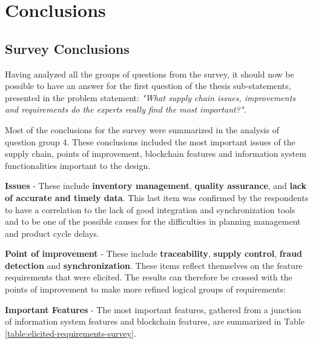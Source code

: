 
\section{Conclusions}

\subsection{Survey Conclusions}

Having analyzed all the groups of questions from the survey, it should now be possible to have an answer for the first question of the thesis sub-statements, presented in the problem statement: \textit{"What supply chain issues, improvements and requirements do the experts really find the most important?"}.

Most of the conclusions for the survey were summarized in the analysis of question group 4. These conclusions included the most important issues of the supply chain, points of improvement, blockchain features and information system functionalities important to the design.


\par \textbf{Issues} - These include \textbf{inventory management}, \textbf{quality assurance}, \textbf{} and \textbf{lack of accurate and timely data}. This last item was confirmed by the respondents to have a correlation to the lack of good integration and synchronization tools and to be one of the possible causes for the difficulties in planning management and product cycle delays.

\par \textbf{Point of improvement} - These include \textbf{traceability}, \textbf{supply control}, \textbf{fraud detection} and \textbf{synchronization}. These items reflect themselves on the feature requirements that were elicited. The results can therefore be crossed with the points of improvement to make more refined logical groups of requirements:

\par \textbf{Important Features} - The most important features, gathered from a junction of information system features and blockchain features, are summarized in Table \ref{table:elicited-requirements-survey}.

